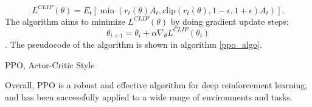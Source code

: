 \begin{equation}
        L^{CLIP}(\theta) = {E}_t \left[ \min \left(r_t(\theta) {A}_t, \text{clip} \left(r_t(\theta), 1-\epsilon, 1+\epsilon \right) {A}_t \right) \right].
\end{equation}
The algorithm aims to minimize $L^{CLIP}(\theta)$ by doing gradient update steps:
\begin{equation}
    \theta_{i+1} = \theta_{i} + \alpha \nabla_{\theta} L^{CLIP}(\theta_i)
\end{equation}
. The pseudocode of the algorithm is shown in algorithm \ref{ppo_algo}.
\begin{algorithm}[h]
    \SetAlgoLined
    \begin{algorithmic}
        
    \end{algorithmic}
    \caption{PPO, Actor-Critic Style}
    \label{ppo_algo}

\end{algorithm}
Overall, PPO is a robust and effective algorithm for deep reinforcement learning, and has been successfully applied to a wide range of environments and tasks.

